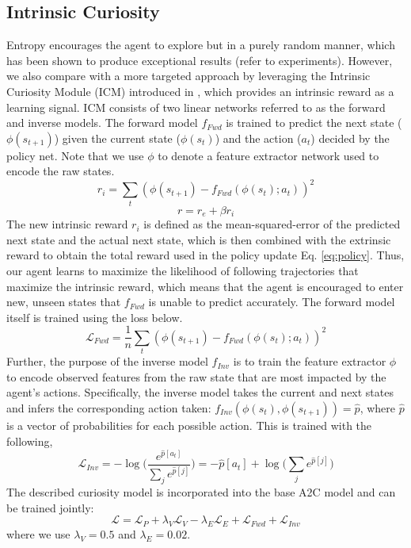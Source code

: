 \documentclass{article}
\begin{document}
\subsection{Intrinsic Curiosity}
Entropy encourages the agent to explore but in a purely random manner, which has been shown to produce exceptional results (refer to experiments). However, we also compare with a more targeted approach by leveraging the Intrinsic Curiosity Module (ICM) introduced in \cite{curiosity}, which provides an intrinsic reward as a learning signal. ICM consists of two linear networks referred to as the forward and inverse models. The forward model $f_{Fwd}$ is trained to predict the next state ($\phi(s_{t+1})$) given the current state ($\phi(s_t)$) and the action ($a_t$) decided by the policy net. Note that we use $\phi$ to denote a feature extractor network used to encode the raw states.
\begin{equation}\label{eq:intrinsic}
r_i = \sum_t (\phi(s_{t+1}) - f_{Fwd}(\phi(s_t);a_t))^2
\end{equation}
\begin{equation}\label{eq:reward}
r = r_e + \beta r_i
\end{equation}
The new intrinsic reward $r_i$ is defined as the mean-squared-error of the predicted next state and the actual next state, which is then combined with the extrinsic reward to obtain the total reward used in the policy update Eq. \ref{eq:policy}. Thus, our agent learns to maximize the likelihood of following trajectories that maximize the intrinsic reward, which means that the agent is encouraged to enter new, unseen states that $f_{Fwd}$ is unable to predict accurately. The forward model itself is trained using the loss below.
\begin{equation}\label{eq:forward}
\mathcal{L}_{Fwd} = \frac{1}{n} \sum_t (\phi(s_{t+1}) - f_{Fwd}(\phi(s_t);a_t))^2
\end{equation}
Further, the purpose of the inverse model $f_{Inv}$ is to train the feature extractor $\phi$ to encode observed features from the raw state that are most impacted by the agent's actions. Specifically, the inverse model takes the current and next states and infers the corresponding action taken: $f_{Inv}(\phi(s_t), \phi(s_{t+1})) = \hat{p}$, where $\hat{p}$ is a vector of probabilities for each possible action. This is trained with the following,
\begin{equation}\label{eq:inverse}
\mathcal{L}_{Inv} = -\log \Big(\frac{e^{\hat{p}[a_t]}}{\sum_j e^{\hat{p}[j]}}\Big) = -\hat{p}[a_t] + \log\Big(\sum_j e^{\hat{p}[j]}\Big)
\end{equation}
The described curiosity model is incorporated into the base A2C model and can be trained jointly:
\begin{equation}
\mathcal{L} = \mathcal{L}_P + \lambda_{V}\mathcal{L}_V - \lambda_{E}\mathcal{L}_E + \mathcal{L}_{Fwd} + \mathcal{L}_{Inv}
\end{equation}
where we use $\lambda_V=0.5$ and $\lambda_E=0.02$.
\end{document}
